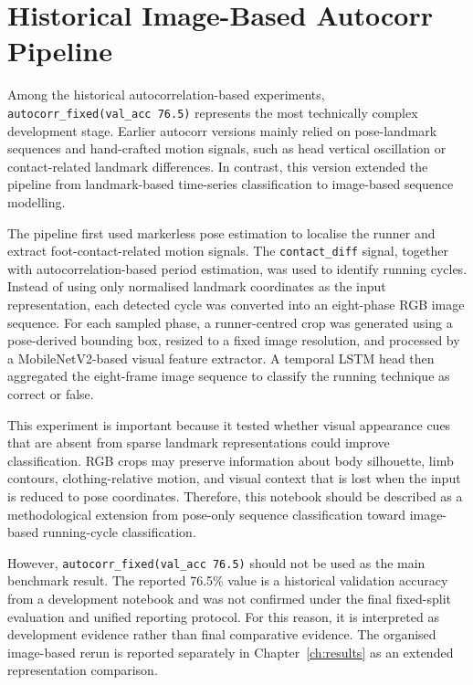 \section{Historical Image-Based Autocorr Pipeline}
\label{app:historical-image-autocorr}

Among the historical autocorrelation-based experiments,
\texttt{autocorr\_fixed(val\_acc 76.5)} represents the most technically complex
development stage. Earlier autocorr versions mainly relied on pose-landmark
sequences and hand-crafted motion signals, such as head vertical oscillation or
contact-related landmark differences. In contrast, this version extended the
pipeline from landmark-based time-series classification to image-based sequence
modelling.

The pipeline first used markerless pose estimation to localise the runner and
extract foot-contact-related motion signals. The \texttt{contact\_diff} signal,
together with autocorrelation-based period estimation, was used to identify
running cycles. Instead of using only normalised landmark coordinates as the
input representation, each detected cycle was converted into an eight-phase RGB
image sequence. For each sampled phase, a runner-centred crop was generated
using a pose-derived bounding box, resized to a fixed image resolution, and
processed by a MobileNetV2-based visual feature extractor. A temporal LSTM head
then aggregated the eight-frame image sequence to classify the running
technique as correct or false.

This experiment is important because it tested whether visual appearance cues
that are absent from sparse landmark representations could improve
classification. RGB crops may preserve information about body silhouette, limb
contours, clothing-relative motion, and visual context that is lost when the
input is reduced to pose coordinates. Therefore, this notebook should be
described as a methodological extension from pose-only sequence classification
toward image-based running-cycle classification.

However, \texttt{autocorr\_fixed(val\_acc 76.5)} should not be used as the main
benchmark result. The reported 76.5\% value is a historical validation accuracy
from a development notebook and was not confirmed under the final fixed-split
evaluation and unified reporting protocol. For this reason, it is interpreted
as development evidence rather than final comparative evidence. The organised
image-based rerun is reported separately in Chapter~\ref{ch:results} as an
extended representation comparison.

